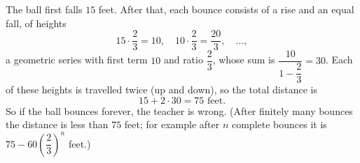 The ball first falls $15$ feet. After that, each bounce consists of a rise and an equal fall, of heights
\[
15\cdot\dfrac{2}{3}=10,\quad 10\cdot\dfrac{2}{3}=\dfrac{20}{3},\quad\dots,
\]
a geometric series with first term $10$ and ratio $\dfrac{2}{3}$, whose sum is $\dfrac{10}{1-\dfrac{2}{3}}=30$. Each of these heights is travelled twice (up and down), so the total distance is
\[
15+2\cdot30=\boxed{75\text{ feet}}.
\]
So if the ball bounces forever, the teacher is wrong. (After finitely many bounces the distance is less than $75$ feet; for example after $n$ complete bounces it is $75-60\left(\dfrac{2}{3}\right)^n$ feet.)
